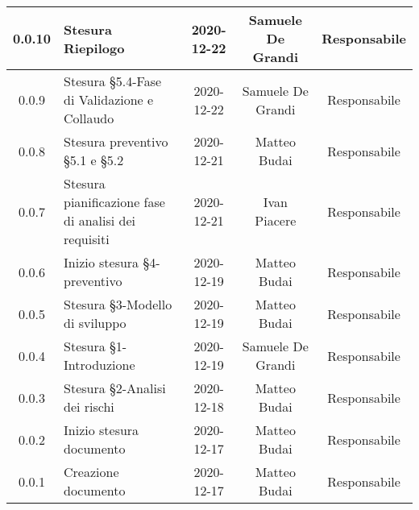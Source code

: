 \begin{center}
\begin{longtable}{|c|p{5cm}|c|c|c|}
	\hline
	0.0.10 & Stesura Riepilogo & 2020-12-22 & Samuele De Grandi & Responsabile \\
	\hline
	0.0.9 & Stesura §5.4-Fase di Validazione e Collaudo & 2020-12-22 & Samuele De Grandi & Responsabile \\
	\hline
	0.0.8 & Stesura preventivo §5.1 e §5.2 & 2020-12-21 & Matteo Budai & Responsabile \\
	\hline
	0.0.7 & Stesura pianificazione fase di analisi dei requisiti & 2020-12-21 & Ivan Piacere & Responsabile \\
	\hline
	0.0.6 & Inizio stesura §4-preventivo & 2020-12-19 & Matteo Budai & Responsabile \\
	\hline
	0.0.5 & Stesura §3-Modello di sviluppo & 2020-12-19 & Matteo Budai & Responsabile \\
	\hline
	0.0.4 & Stesura §1-Introduzione & 2020-12-19 & Samuele De Grandi & Responsabile \\
	\hline
	0.0.3 & Stesura §2-Analisi dei rischi & 2020-12-18 & Matteo Budai & Responsabile \\
	\hline
	0.0.2 & Inizio stesura documento & 2020-12-17 & Matteo Budai & Responsabile \\
	\hline
	0.0.1 & Creazione documento & 2020-12-17 & Matteo Budai & Responsabile \\
	\hline

	\end{longtable}
\end{center}